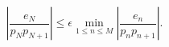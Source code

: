 \[\left|\frac{e_{N}}{p_{N}p_{N+1}}\right|\leq\epsilon\min_{1\leq n\leq M}\left|%
\frac{e_{n}}{p_{n}p_{n+1}}\right|.\]